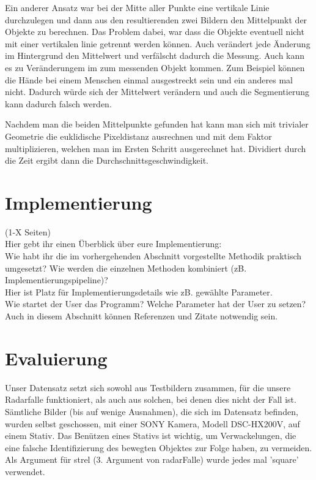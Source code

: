 \documentclass[deutsch]{scrartcl}
\begin{document}
Ein anderer Ansatz war bei der Mitte aller Punkte eine vertikale Linie durchzulegen und dann aus den resultierenden zwei Bildern den Mittelpunkt der Objekte zu berechnen. Das Problem dabei, war dass die Objekte eventuell nicht mit einer vertikalen linie getrennt werden können. Auch verändert jede Änderung im Hintergrund den Mittelwert und verfälscht dadurch die Messung. Auch kann es zu Veränderungem im zum messenden Objekt kommen. Zum Beispiel können die Hände bei einem Menschen einmal ausgestreckt sein und ein anderes mal nicht. Dadurch würde sich der Mittelwert verändern und auch die Segmentierung kann dadurch falsch werden.

Nachdem man die beiden Mittelpunkte gefunden hat kann man sich mit trivialer Geometrie die euklidische Pixeldistanz ausrechnen und mit dem Faktor multiplizieren, welchen man im Ersten Schritt ausgerechnet hat. Dividiert durch die Zeit ergibt dann die Durchschnittsgeschwindigkeit.


\section{Implementierung}
(1-X Seiten)\\
Hier gebt ihr einen Überblick über eure Implementierung:\\
Wie habt ihr die im vorhergehenden Abschnitt vorgestellte Methodik praktisch umgesetzt? Wie werden die einzelnen Methoden kombiniert (zB. Implementierungspipeline)?\\
Hier ist Platz für Implementierungsdetails wie zB. gewählte Parameter. \\
Wie startet der User das Programm? Welche Parameter hat der User zu setzen?\\
Auch in diesem Abschnitt können Referenzen und Zitate notwendig sein.\\

\section{Evaluierung}
Unser Datensatz setzt sich sowohl aus Testbildern zusammen, für die unsere Radarfalle funktioniert, als auch aus solchen, bei denen dies nicht der Fall ist. Sämtliche Bilder (bis auf wenige Ausnahmen), die sich im Datensatz befinden, wurden selbst geschossen, mit einer SONY Kamera, Modell DSC-HX200V, auf einem Stativ. Das Benützen eines Stativs ist wichtig, um Verwackelungen, die eine falsche Identifizierung des bewegten Objektes zur Folge haben, zu vermeiden. Als Argument für strel (3. Argument von radarFalle) wurde jedes mal 'square' verwendet.
\end{document}

